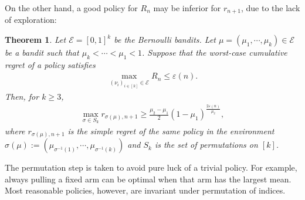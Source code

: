 \documentclass[10pt, openright]{book}
\numberwithin{equation}{section}
\theoremstyle{plain}
\newtheorem{Th}{Theorem}[section]
\theoremstyle{definition}
\def\e{{\varepsilon}}
\begin{document}
On the other hand, a good policy for $R_n$ may be inferior for $r_{n+1}$, due to the lack of exploration:

\begin{Th}\label{bb:LB}
Let $\mathcal E=[0,1]^k$ be the Bernoulli bandits. Let $\mu = (\mu_1, \cdots, \mu_k)\in\mathcal E$ be a bandit such that $\mu_k<\cdots<\mu_1<1$. Suppose that the worst-case cumulative regret of a policy satisfies 
\begin{align}
\max_{(\nu_i)_{i\in [k]}\in\mathcal E}R_n\leq\e(n). \label{bb:1}
\end{align}
Then, for $k\geq 3$,
\begin{align*}
\max_{\sigma\in S_k}r_{\sigma(\mu), n+1}\geq\frac{\mu_2-\mu_1}{2}(1-\mu_1)^{\frac{2\e(n)}{\mu_2}},
\end{align*}
where $r_{\sigma(\mu), n+1}$ is the simple regret of the same policy in the environment $\sigma(\mu):=(\mu_{\sigma^{-1}(1)}, \cdots, \mu_{\sigma^{-1}(k)})$ and $S_k$ is the set of permutations on $[k]$.  
\end{Th}
The permutation step is taken to avoid pure luck of a trivial policy. For example, always pulling a fixed arm can be optimal when that arm has the largest mean. Most reasonable policies, however, are invariant under permutation of indices. 
\end{document}
